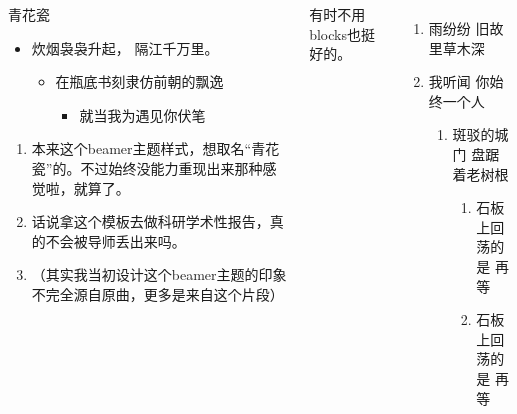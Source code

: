 \documentclass[t,linewidth=1.4]{ctexbeamer}
\begin{document}
\begin{frame}
\begin{columns}[T]
    
    \begin{block}{青花瓷}
        \begin{itemize}
            \item 炊烟袅袅升起， 隔江千万里。
            \begin{itemize}
                \item 在瓶底书刻隶仿前朝的飘逸
                \begin{itemize}
                    \item 就当我为遇见你伏笔
                \end{itemize}
            \end{itemize}
        \end{itemize}
        
        \begin{enumerate}
            \item 本来这个beamer主题样式，想取名“青花瓷”的。不过始终没能力重现出来那种感觉啦，就算了。
            \item 话说拿这个模板去做科研学术性报告，真的不会被导师丢出来吗。
            \item \begin{minipage}[t]{.8\hsize}（其实我当初设计这个beamer主题的印象不完全源自原曲，更多是来自这个片段）\end{minipage}\quad
        \end{enumerate}
    \end{block}

    有时不用blocks也挺好的。
    \begin{enumerate}
        \item 雨纷纷 旧故里草木深
        \item 我听闻 你始终一个人
        \begin{enumerate}
            \item 斑驳的城门 盘踞着老树根
            \begin{enumerate}
                \item 石板上回荡的是 再等
                \item 石板上回荡的是 再等
            \end{enumerate}
        \end{enumerate}
    \end{enumerate}
\end{columns}


\end{frame}
\end{document}
